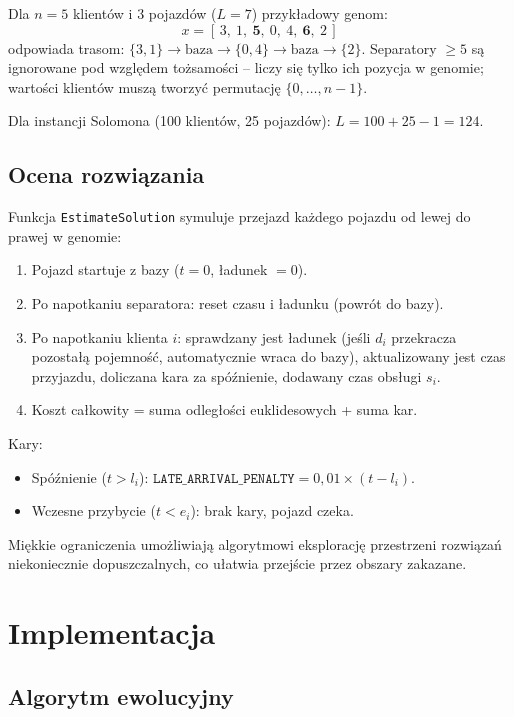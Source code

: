 \documentclass[11pt,a4paper]{article}
\begin{document}
Dla $n=5$ klientów i 3 pojazdów ($L=7$) przykładowy genom:
\[
  x = [\,3,\ 1,\ \mathbf{5},\ 0,\ 4,\ \mathbf{6},\ 2\,]
\]
odpowiada trasom: $\{3,1\} \to \text{baza} \to \{0,4\} \to \text{baza} \to \{2\}$.
Separatory $\geq 5$ są ignorowane pod względem tożsamości -- liczy się tylko ich
pozycja w genomie; wartości klientów muszą tworzyć permutację $\{0,\ldots,n-1\}$.

Dla instancji Solomona (100 klientów, 25 pojazdów): $L = 100 + 25 - 1 = 124$.

\subsection{Ocena rozwiązania}

Funkcja \texttt{EstimateSolution} symuluje przejazd każdego pojazdu od lewej do prawej
w genomie:
\begin{enumerate}
    \item Pojazd startuje z bazy ($t=0$, ładunek $=0$).
    \item Po napotkaniu separatora: reset czasu i ładunku (powrót do bazy).
    \item Po napotkaniu klienta $i$: sprawdzany jest ładunek (jeśli $d_i$ przekracza pozostałą
          pojemność, automatycznie wraca do bazy), aktualizowany jest czas przyjazdu,
          doliczana kara za spóźnienie, dodawany czas obsługi $s_i$.
    \item Koszt całkowity = suma odległości euklidesowych + suma kar.
\end{enumerate}

Kary:
\begin{itemize}
    \item Spóźnienie ($t > l_i$): $\texttt{LATE\_ARRIVAL\_PENALTY} = 0{,}01 \times (t - l_i)$.
    \item Wczesne przybycie ($t < e_i$): brak kary, pojazd czeka.
\end{itemize}

Miękkie ograniczenia umożliwiają algorytmowi eksplorację przestrzeni rozwiązań
niekoniecznie dopuszczalnych, co ułatwia przejście przez obszary zakazane.

\section{Implementacja}

\subsection{Algorytm ewolucyjny}
\label{sec:ea}
\end{document}
